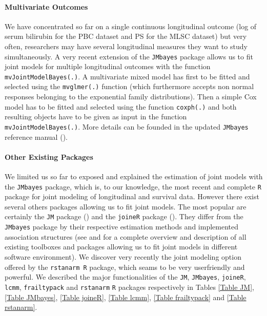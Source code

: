 \documentclass[12pt]{article}
\begin{document}
\paragraph{Multivariate Outcomes}
We have concentrated so far on a single continuous longitudinal outcome (log of serum bilirubin for the PBC dataset and PS for the MLSC dataset) but very often, researchers may have several longitudinal measures they want to study simultaneously. A very recent extension of the \texttt{JMbayes} package allows us to fit joint models for multiple longitudinal outcomes with the function
\texttt{mvJointModelBayes(.)}. A multivariate mixed model has first to be fitted and selected using the \texttt{mvglmer(.)} function (which furthermore accepts non normal responses belonging to the exponential family distributions). Then a simple Cox model has to be fitted and selected using the function \texttt{coxph(.)} and both resulting objects have to be given as input in the function \texttt{mvJointModelBayes(.)}. More details can be founded in the updated \texttt{JMbayes} reference manual (\cite{rizopoulos2017package}).

\paragraph{Other Existing Packages}
We limited us so far to exposed and explained the estimation of joint models with the \texttt{JMbayes} package, which is, to our knowledge, the most recent and complete \texttt{R} package for joint modeling of longitudinal and survival data. However there exist several others packages allowing us to fit joint models. The most popular are certainly the \texttt{JM} package (\cite{JM}) and the \texttt{joineR} package (\cite{joiner_2017}). They differ from the \texttt{JMbayes} package by their respective estimation methods and implemented association structures (see \cite{gould_joint_2015} and \cite{Krol_2017} for a complete overview and description of all existing toolboxes and packages allowing us to fit joint models in different software environment). We discover very recently the joint modeling option offered by the \texttt{rstanarm R} package, which seams to be very userfriendly and powerful. We described the major functionalities of the \texttt{JM}, \texttt{JMbayes}, \texttt{joineR}, \texttt{lcmm}, \texttt{frailtypack} and \texttt{rstanarm} \texttt{R} packages respectively in Tables \ref{Table JM}, \ref{Table JMbayes}, \ref{Table joineR}, \ref{Table lcmm}, \ref{Table frailtypack} and \ref{Table rstanarm}.
\end{document}
